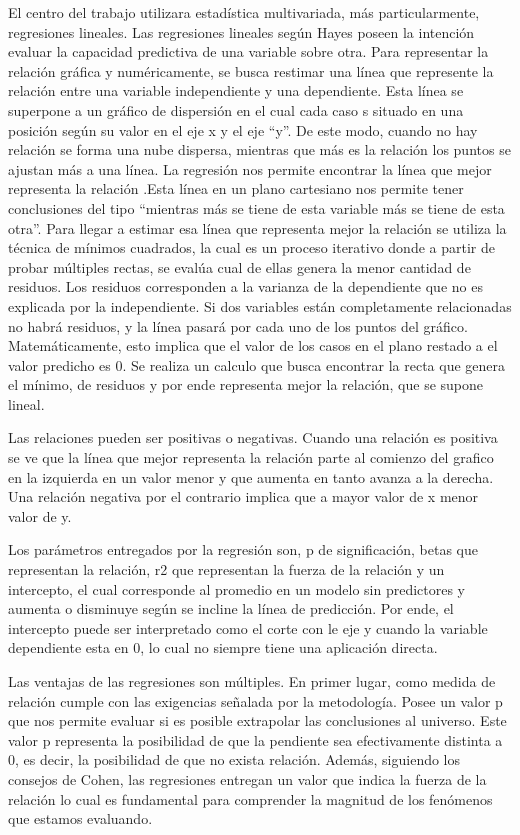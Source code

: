 \documentclass[12pt,twoside]{templates/facsothesis}
\begin{document}
El centro del trabajo utilizara estadística multivariada, más particularmente, regresiones lineales. Las regresiones lineales según Hayes poseen la intención evaluar la capacidad predictiva de una variable sobre otra. Para representar la relación gráfica y numéricamente, se busca restimar una línea que represente la relación entre una variable independiente y una dependiente. Esta línea se superpone a un gráfico de dispersión en el cual cada caso s situado en una posición según su valor en el eje x y el eje ``y''. De este modo, cuando no hay relación se forma una nube dispersa, mientras que más es la relación los puntos se ajustan más a una línea. La regresión nos permite encontrar la línea que mejor representa la relación .Esta línea en un plano cartesiano nos permite tener conclusiones del tipo ``mientras más se tiene de esta variable más se tiene de esta otra''. Para llegar a estimar esa línea que representa mejor la relación se utiliza la técnica de mínimos cuadrados, la cual es un proceso iterativo donde a partir de probar múltiples rectas, se evalúa cual de ellas genera la menor cantidad de residuos. Los residuos corresponden a la varianza de la dependiente que no es explicada por la independiente. Si dos variables están completamente relacionadas no habrá residuos, y la línea pasará por cada uno de los puntos del gráfico. Matemáticamente, esto implica que el valor de los casos en el plano restado a el valor predicho es 0. Se realiza un calculo que busca encontrar la recta que genera el mínimo, de residuos y por ende representa mejor la relación, que se supone lineal.

Las relaciones pueden ser positivas o negativas. Cuando una relación es positiva se ve que la línea que mejor representa la relación parte al comienzo del grafico en la izquierda en un valor menor y que aumenta en tanto avanza a la derecha. Una relación negativa por el contrario implica que a mayor valor de x menor valor de y.

Los parámetros entregados por la regresión son, p de significación, betas que representan la relación, r2 que representan la fuerza de la relación y un intercepto, el cual corresponde al promedio en un modelo sin predictores y aumenta o disminuye según se incline la línea de predicción. Por ende, el intercepto puede ser interpretado como el corte con le eje y cuando la variable dependiente esta en 0, lo cual no siempre tiene una aplicación directa.

Las ventajas de las regresiones son múltiples. En primer lugar, como medida de relación cumple con las exigencias señalada por la metodología. Posee un valor p que nos permite evaluar si es posible extrapolar las conclusiones al universo. Este valor p representa la posibilidad de que la pendiente sea efectivamente distinta a 0, es decir, la posibilidad de que no exista relación. Además, siguiendo los consejos de Cohen, las regresiones entregan un valor que indica la fuerza de la relación lo cual es fundamental para comprender la magnitud de los fenómenos que estamos evaluando.
\end{document}
